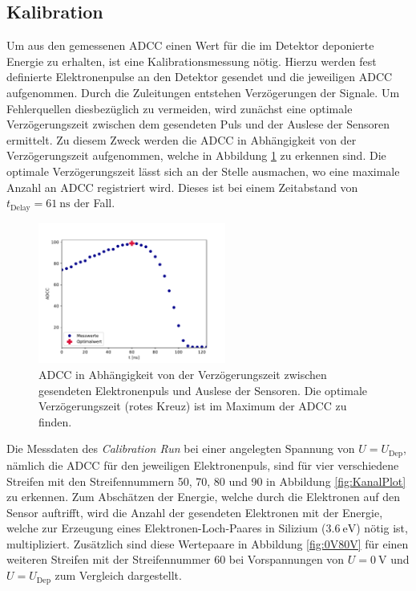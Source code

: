 \subsection{Kalibration}
\label{kap:Kalibration}
Um aus den gemessenen ADCC einen Wert für die im Detektor deponierte Energie zu erhalten, ist eine Kalibrationsmessung nötig. Hierzu werden fest definierte Elektronenpulse an den Detektor gesendet und die jeweiligen ADCC aufgenommen.
Durch die Zuleitungen entstehen Verzögerungen der Signale. Um Fehlerquellen diesbezüglich zu vermeiden, wird zunächst eine optimale Verzögerungszeit zwischen dem gesendeten Puls und der Auslese der Sensoren ermittelt. Zu diesem Zweck werden die ADCC in Abhängigkeit von der Verzögerungszeit aufgenommen, welche in Abbildung \ref{fig:Delay} zu erkennen sind. Die optimale Verzögerungszeit lässt sich an der Stelle ausmachen, wo eine maximale Anzahl an ADCC registriert wird. Dieses ist bei einem Zeitabstand von $t_{\mathrm{Delay}}=\SI{61}{\nano\second}$ der Fall.
\begin{figure}
  \centering
  \includegraphics[width=0.55\textwidth]{plots/Delay.pdf}
  \caption{ADCC in Abhängigkeit von der Verzögerungszeit zwischen gesendeten Elektronenpuls und Auslese der Sensoren. Die optimale Verzögerungszeit (rotes Kreuz) ist im Maximum der ADCC zu finden.}
  \label{fig:Delay}
\end{figure}
\FloatBarrier
Die Messdaten des \textit{Calibration Run} bei einer angelegten Spannung von $U=U_\text{Dep}$, nämlich die ADCC für den jeweiligen Elektronenpuls, sind für vier verschiedene Streifen mit den Streifennummern 50, 70, 80 und 90 in Abbildung \ref{fig:KanalPlot} zu erkennen. Zum Abschätzen der Energie, welche durch die Elektronen auf den Sensor auftrifft, wird die Anzahl der gesendeten Elektronen mit der Energie, welche zur Erzeugung eines Elektronen-Loch-Paares in Silizium ($\SI{3.6}{\electronvolt}$) nötig ist, multipliziert. Zusätzlich sind diese Wertepaare in Abbildung \ref{fig:0V80V} für einen weiteren Streifen mit der Streifennummer 60 bei Vorspannungen von $U=\SI{0}{\volt}$ und $U=U_{\mathrm{Dep}}$ zum Vergleich dargestellt.
